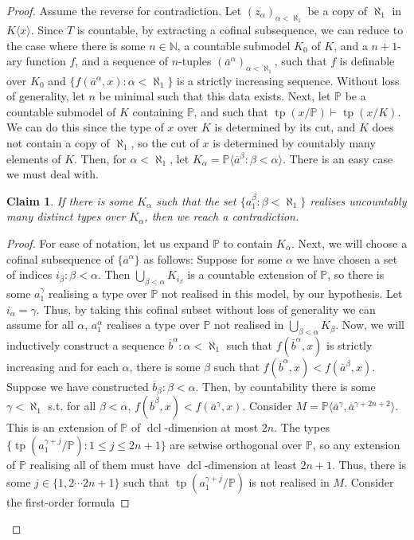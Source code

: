 \documentclass[10pt,a4paper]{amsart}
\newtheorem{claim}{Claim}
\newcommand{\bP}{\mathbb P}
\DeclareMathOperator{\dcl}{\mathrm{dcl}}
\newcommand{\oa}{\overline{a}}
\newcommand{\ob}{\overline{b}}
\DeclareMathOperator{\tp}{\mathrm{tp}}
\begin{document}
\begin{proof}
    Assume the reverse for contradiction. Let $(z_\alpha)_{\alpha<\aleph_1}$ be a copy of $\aleph_1$ in $K\langle x \rangle$.
    Since $T$ is countable, by extracting a cofinal subsequence, we can reduce to the case where there is some $n \in \mathbb{N}$, a countable submodel $K_0$ of $K$, and a $n+1$-ary function $f$, and a sequence of $n$-tuples $(\oa^\alpha)_{ \alpha<\aleph_1}$, such that $f$ is definable over $K_0$ and $\{f(\oa^\alpha,x) : \alpha<\aleph_1\}$ is a strictly increasing sequence.
    Without loss of generality, let $n$ be minimal such that this data exists.
    Next, let $\bP$ be a countable submodel of $K$ containing $\bP$, and such that $\tp(x/\bP) \vdash \tp(x/K)$. We can do this since the type of $x$ over $K$ is determined by its cut, and $K$ does not contain a copy of $\aleph_1$, so the cut of $x$ is determined by countably many elements of $K$. Then, for $\alpha<\aleph_1$, let $K_\alpha = \bP\langle \oa^\beta : \beta<\alpha\rangle$.
    There is an easy case we must deal with.
    \begin{claim}
        If there is some $K_\alpha$ such that the set $\{ a_1^{\beta} : \beta<\aleph_1\}$ realises uncountably many distinct types over $K_\alpha$, then we reach a contradiction.
    \end{claim}
    \begin{proof}
        For ease of notation, let us expand $\bP$ to contain $K_\alpha$. Next, we will choose a cofinal subsequence of $\{\oa^{\alpha}\}$ as follows: Suppose for some $\alpha$ we have chosen a set of indices $i_\beta : \beta<\alpha$. Then $\bigcup_{\beta<\alpha}K_{i_\beta}$ is a countable extension of $\bP$, so there is some $a_1^{\gamma}$ realising a type over $\bP$ not realised in this model, by our hypothesis. Let $i_\alpha = \gamma$. Thus, by taking this cofinal subset without loss of generality we can assume for all $\alpha$, $a_1^{\alpha}$ realises a type over $\bP$ not realised in $\bigcup_{\beta<\alpha}K_\beta$.
        Now, we will inductively construct a sequence $\ob^\alpha : \alpha<\aleph_1$ such that $f(\ob^{\alpha},x)$ is strictly increasing and for each $\alpha$, there is some $\beta$ such that $f(\ob^{\alpha},x) < f(\oa^{\beta},x)$. Suppose we have constructed $\ob_\beta : \beta<\alpha$. Then, by countability there is some $\gamma<\aleph_1$ s.t. for all $\beta<\alpha$, $f(\ob^\beta,x)<f(\oa^\gamma,x)$.
        Consider $M = \bP\langle \oa^\gamma,\oa^{\gamma+2n+2}\rangle$. This is an extension of $\bP$ of $\dcl$-dimension at most $2n$. The types $\{\tp(a_1^{\gamma+j}/\bP) : 1\leq j\leq 2n+1\}$ are setwise orthogonal over $\bP$, so any extension of $\bP$ realising all of them must have $\dcl$-dimension at least $2n+1$. Thus, there is some $j \in \{1,2\cdots 2n+1\}$ such that $\tp(a_1^{\gamma+j}/\bP)$ is not realised in $M$. Consider the first-order formula

\end{proof}
\end{proof}
\end{document}
